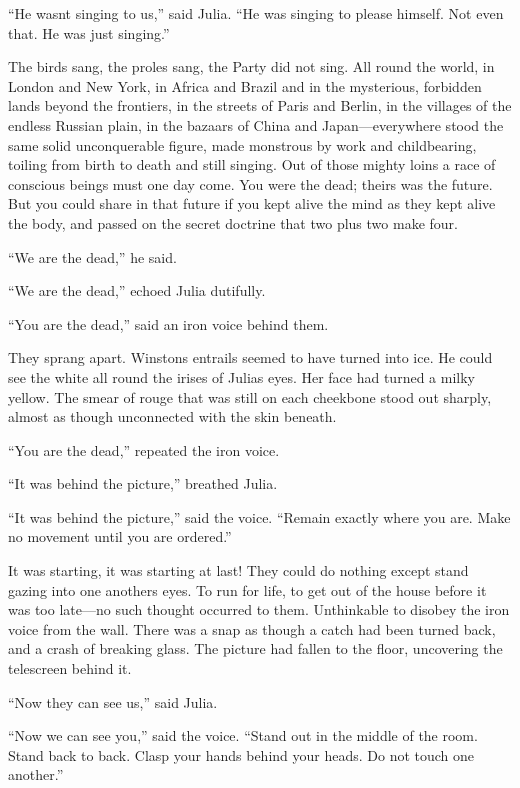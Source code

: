 ``He wasn\textquotesingle t singing to us,'' said Julia. ``He was singing
to please himself. Not even that. He was just singing.''

The birds sang, the proles sang, the Party did not sing. All round the
world, in London and New York, in Africa and Brazil and in the
mysterious, forbidden lands beyond the frontiers, in the streets of
Paris and Berlin, in the villages of the endless Russian plain, in the
bazaars of China and Japan---everywhere stood the same solid
unconquerable figure, made monstrous by work and childbearing, toiling
from birth to death and still singing. Out of those mighty loins a race
of conscious beings must one day come. You were the dead; theirs was the
future. But you could share in that future if you kept alive the mind as
they kept alive the body, and passed on the secret doctrine that two
plus two make four.

``We are the dead,'' he said.

``We are the dead,'' echoed Julia dutifully.

``You are the dead,'' said an iron voice behind them.

They sprang apart. Winston\textquotesingle s entrails seemed to have
turned into ice. He could see the white all round the irises of
Julia\textquotesingle s eyes. Her face had turned a milky yellow. The
smear of rouge that was still on each cheekbone stood out sharply,
almost as though unconnected with the skin beneath.

``You are the dead,'' repeated the iron voice.

``It was behind the picture,'' breathed Julia.

``It was behind the picture,'' said the voice. ``Remain exactly where you
are. Make no movement until you are ordered.''

It was starting, it was starting at last! They could do nothing except
stand gazing into one another\textquotesingle s eyes. To run for life,
to get out of the house before it was too late---no such thought
occurred to them. Unthinkable to disobey the iron voice from the wall.
There was a snap as though a catch had been turned back, and a crash of
breaking glass. The picture had fallen to the floor, uncovering the
telescreen behind it.

``Now they can see us,'' said Julia.

``Now we can see you,'' said the voice. ``Stand out in the middle of the
room. Stand back to back. Clasp your hands behind your heads. Do not
touch one another.''


